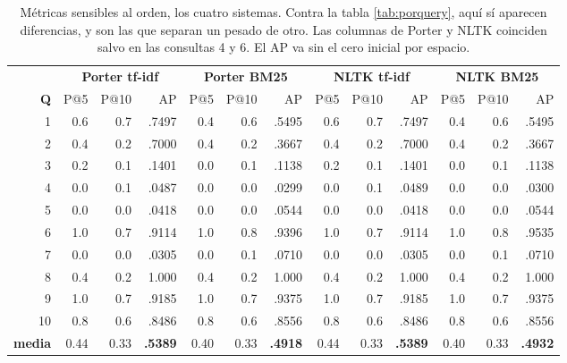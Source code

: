 \documentclass[11pt,letterpaper]{article}
\begin{document}
\begin{table}[H]
  \centering
  \footnotesize
  \begin{tabular}{r rrr rrr rrr rrr}
    \toprule
    & \multicolumn{3}{c}{\textbf{Porter tf-idf}}
    & \multicolumn{3}{c}{\textbf{Porter BM25}}
    & \multicolumn{3}{c}{\textbf{NLTK tf-idf}}
    & \multicolumn{3}{c}{\textbf{NLTK BM25}} \\
    \cmidrule(lr){2-4} \cmidrule(lr){5-7}
    \cmidrule(lr){8-10} \cmidrule(lr){11-13}
    \textbf{Q}
      & P@5 & P@10 & AP & P@5 & P@10 & AP
      & P@5 & P@10 & AP & P@5 & P@10 & AP \\
    \midrule
     1 & 0.6 & 0.7 & .7497 & 0.4 & 0.6 & .5495
       & 0.6 & 0.7 & .7497 & 0.4 & 0.6 & .5495 \\
     2 & 0.4 & 0.2 & .7000 & 0.4 & 0.2 & .3667
       & 0.4 & 0.2 & .7000 & 0.4 & 0.2 & .3667 \\
     3 & 0.2 & 0.1 & .1401 & 0.0 & 0.1 & .1138
       & 0.2 & 0.1 & .1401 & 0.0 & 0.1 & .1138 \\
     4 & 0.0 & 0.1 & .0487 & 0.0 & 0.0 & .0299
       & 0.0 & 0.1 & .0489 & 0.0 & 0.0 & .0300 \\
     5 & 0.0 & 0.0 & .0418 & 0.0 & 0.0 & .0544
       & 0.0 & 0.0 & .0418 & 0.0 & 0.0 & .0544 \\
     6 & 1.0 & 0.7 & .9114 & 1.0 & 0.8 & .9396
       & 1.0 & 0.7 & .9114 & 1.0 & 0.8 & .9535 \\
     7 & 0.0 & 0.0 & .0305 & 0.0 & 0.1 & .0710
       & 0.0 & 0.0 & .0305 & 0.0 & 0.1 & .0710 \\
     8 & 0.4 & 0.2 & 1.000 & 0.4 & 0.2 & 1.000
       & 0.4 & 0.2 & 1.000 & 0.4 & 0.2 & 1.000 \\
     9 & 1.0 & 0.7 & .9185 & 1.0 & 0.7 & .9375
       & 1.0 & 0.7 & .9185 & 1.0 & 0.7 & .9375 \\
    10 & 0.8 & 0.6 & .8486 & 0.8 & 0.6 & .8556
       & 0.8 & 0.6 & .8486 & 0.8 & 0.6 & .8556 \\
    \midrule
    \textbf{media} & 0.44 & 0.33 & \textbf{.5389}
      & 0.40 & 0.33 & \textbf{.4918}
      & 0.44 & 0.33 & \textbf{.5389}
      & 0.40 & 0.33 & \textbf{.4932} \\
    \bottomrule
  \end{tabular}
  \caption{Métricas sensibles al orden, los cuatro sistemas.
    Contra la tabla \ref{tab:porquery}, aquí sí aparecen
    diferencias, y son las que separan un pesado de otro. Las
    columnas de Porter y NLTK coinciden salvo en las consultas 4
    y 6. El AP va sin el cero inicial por espacio.}
  \label{tab:rango}
\end{table}
\end{document}
